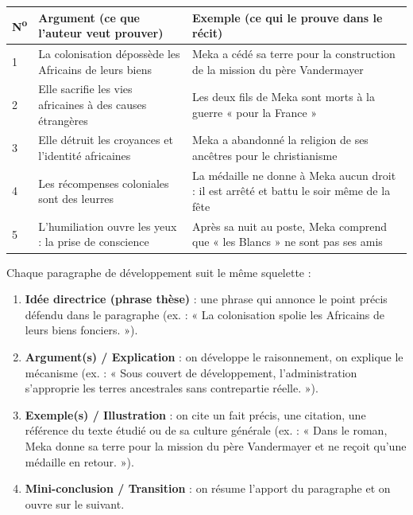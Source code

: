 \documentclass[11pt]{article}
\begin{document}
\begin{center}
\begin{tabularx}{\linewidth}{|l|X|X|}
\hline
\rowcolor{popblueL} \textbf{N\textsuperscript{o}} & \textbf{Argument (ce que l'auteur veut prouver)} & \textbf{Exemple (ce qui le prouve dans le récit)} \\
\hline
1 & La colonisation dépossède les Africains de leurs biens & Meka a cédé sa terre pour la construction de la mission du père Vandermayer \\
\hline
2 & Elle sacrifie les vies africaines à des causes étrangères & Les deux fils de Meka sont morts à la guerre « pour la France » \\
\hline
3 & Elle détruit les croyances et l'identité africaines & Meka a abandonné la religion de ses ancêtres pour le christianisme \\
\hline
4 & Les récompenses coloniales sont des leurres & La médaille ne donne à Meka aucun droit : il est arrêté et battu le soir même de la fête \\
\hline
5 & L'humiliation ouvre les yeux : la prise de conscience & Après sa nuit au poste, Meka comprend que « les Blancs » ne sont pas ses amis \\
\hline
\end{tabularx}
\end{center}

\begin{methode}
Chaque paragraphe de développement suit le même squelette :
\begin{enumerate}
\item \textbf{Idée directrice (phrase thèse)} : une phrase qui annonce le point précis défendu dans le paragraphe (ex. : « La colonisation spolie les Africains de leurs biens fonciers. »).
\item \textbf{Argument(s) / Explication} : on développe le raisonnement, on explique le mécanisme (ex. : « Sous couvert de développement, l'administration s'approprie les terres ancestrales sans contrepartie réelle. »).
\item \textbf{Exemple(s) / Illustration} : on cite un fait précis, une citation, une référence du texte étudié ou de sa culture générale (ex. : « Dans le roman, Meka donne sa terre pour la mission du père Vandermayer et ne reçoit qu'une médaille en retour. »).
\item \textbf{Mini-conclusion / Transition} : on résume l'apport du paragraphe et on ouvre sur le suivant.
\end{enumerate}
\end{methode}
\end{document}
